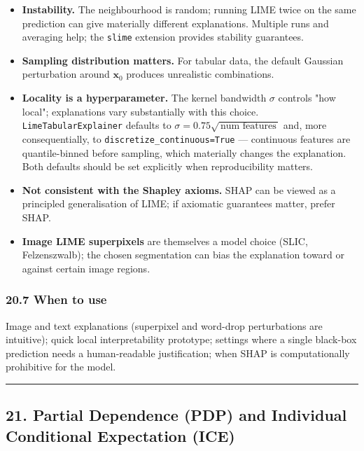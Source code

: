 \documentclass{article}
\providecommand{\tightlist}{\setlength{\itemsep}{0pt}\setlength{\parskip}{0pt}}
\begin{document}
\begin{itemize}
\tightlist
\item
  \textbf{Instability.} The neighbourhood is random; running LIME twice
  on the same prediction can give materially different explanations.
  Multiple runs and averaging help; the \texttt{slime} extension
  provides stability guarantees.
\item
  \textbf{Sampling distribution matters.} For tabular data, the default
  Gaussian perturbation around \(\mathbf{x}_0\) produces unrealistic
  combinations.
\item
  \textbf{Locality is a hyperparameter.} The kernel bandwidth \(\sigma\)
  controls "how local"; explanations vary substantially with this
  choice. \texttt{LimeTabularExplainer} defaults to
  \(\sigma = 0.75 \sqrt{\,\text{num features}\,}\) and, more
  consequentially, to \texttt{discretize\_continuous=True} ---
  continuous features are quantile-binned before sampling, which
  materially changes the explanation. Both defaults should be set
  explicitly when reproducibility matters.
\item
  \textbf{Not consistent with the Shapley axioms.} SHAP can be viewed as
  a principled generalisation of LIME; if axiomatic guarantees matter,
  prefer SHAP.
\item
  \textbf{Image LIME superpixels} are themselves a model choice (SLIC,
  Felzenszwalb); the chosen segmentation can bias the explanation toward
  or against certain image regions.
\end{itemize}

\subsubsection{20.7 When to use}\label{207-when-to-use}

Image and text explanations (superpixel and word-drop perturbations are
intuitive); quick local interpretability prototype; settings where a
single black-box prediction needs a human-readable justification; when
SHAP is computationally prohibitive for the model.

\begin{center}\rule{0.5\linewidth}{0.5pt}\end{center}

\subsection{21. Partial Dependence (PDP) and Individual Conditional
Expectation
(ICE)}\label{21-partial-dependence-pdp-and-individual-conditional-expectation-ice}
\end{document}
